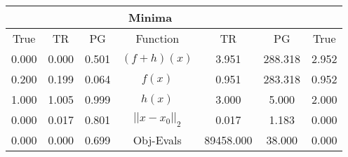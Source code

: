 \begin{tabular}{| c |c |c || c |c |c |c |}
    \hline
    \rowcolor[gray]{0.9}
\multicolumn{3}{|c|}{Parameters} & \multicolumn{4}{|c|}{Minima}\\ \hline True & TR & PG  & Function & TR & PG & True \\
    \hline
  \rowcolor[gray]{0.7}
  0.000 & 0.000 & 0.501   & $ (f + h)(x) $ & 3.951 & 288.318 & 2.952 \\
  \rowcolor[gray]{0.8}
  0.200 & 0.199 & 0.064   & $ f(x) $ & 0.951 & 283.318 & 0.952 \\
  \rowcolor[gray]{0.7}
  1.000 & 1.005 & 0.999   & $ h(x) $ & 3.000 & 5.000 & 2.000 \\
  \rowcolor[gray]{0.8}
  0.000 & 0.017 & 0.801   & $ ||x - x_0||_2 $ & 0.017 & 1.183 & 0.000 \\
  \rowcolor[gray]{0.7}
  0.000 & 0.000 & 0.699   & Obj-Evals & 89458.000 & 38.000 & 0.000 \\
\end{tabular}
